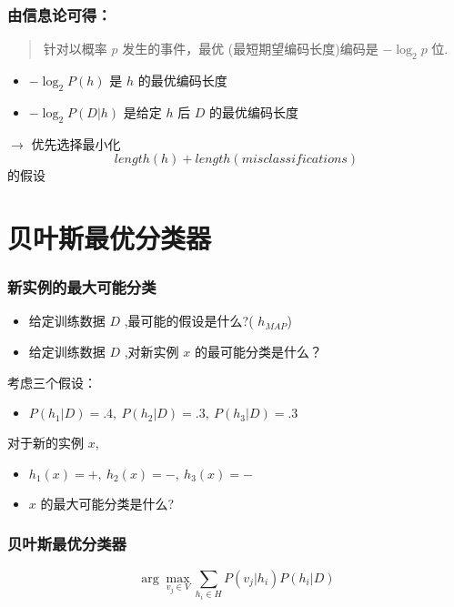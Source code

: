 \documentclass{beamer}
\begin{document}
\begin{frame}
\frametitle{由信息论可得：}
\label{sec-4-3}

\begin{quote}
针对以概率 $p$ 发生的事件，最优 (最短期望编码长度)编码是 $- \log_{2} p$ 位.
\end{quote}

\begin{itemize}
\item $- \log_{2} P(h)$ 是 $h$ 的最优编码长度
\item $- \log_{2} P(D|h)$ 是给定 $h$ 后 $D$ 的最优编码长度
\end{itemize}

$\rightarrow$ 优先选择最小化
$$length(h) + length(misclassifications)$$
的假设
\end{frame}
\section{贝叶斯最优分类器}
\label{sec-5}
\begin{frame}
\frametitle{新实例的最大可能分类}
\label{sec-5-1}


\begin{itemize}
\item 给定训练数据 $D$ ,最可能的假设是什么?( $h_{MAP}$)
\item 给定训练数据 $D$ ,对新实例 $x$ 的最可能分类是什么？
\end{itemize}

考虑三个假设：
\begin{itemize}
\item $P(h_{1}|D)=.4, \  P(h_{2}|D)=.3, \  P(h_{3}|D)=.3$
\end{itemize}

对于新的实例 $x$, 
\begin{itemize}
\item $h_{1}(x)=+, \ h_{2}(x)=-, \ h_{3}(x)=-$
\item $x$ 的最大可能分类是什么?
\end{itemize}
\end{frame}
\begin{frame}
\frametitle{贝叶斯最优分类器}
\label{sec-5-2}


$$\arg \max_{v_{j} \in V} \sum_{h_{i} \in H} P(v_{j}|h_{i}) P(h_{i}|D)$$
\end{frame}
\end{document}
